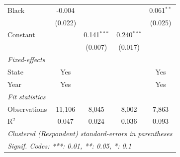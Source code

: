 \begin{tabular}{lcccc}
   Black                          & -0.004        &               &                & 0.061$^{**}$\\   
                                  & (0.022)       &               &                & (0.025)\\   
   Constant                       &               & 0.141$^{***}$ & 0.240$^{***}$  &   \\   
                                  &               & (0.007)       & (0.017)        &   \\   
   \midrule
   \emph{Fixed-effects}\\
   State                          & Yes           &               &                & Yes\\  
   Year                           & Yes           &               &                & Yes\\  
   \midrule
   \emph{Fit statistics}\\
   Observations                   & 11,106        & 8,045         & 8,002          & 7,863\\  
   R$^2$                          & 0.047         & 0.024         & 0.036          & 0.093\\  
   \midrule \midrule
   \multicolumn{5}{l}{\emph{Clustered (Respondent) standard-errors in parentheses}}\\
   \multicolumn{5}{l}{\emph{Signif. Codes: ***: 0.01, **: 0.05, *: 0.1}}\\
\end{tabular}
\par\endgroup


